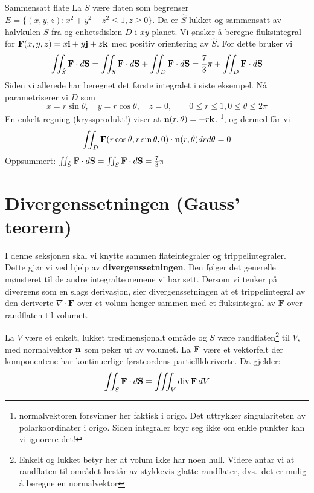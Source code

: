 \begin{eks}{Sammensatt flate}
La $\hat{S}$ være flaten som begrenser $E=\{(x,y,z) \colon x^2+y^2+z^2\leq 1, z \geq 0\}$. 
Da er $\hat{S}$ lukket og sammensatt av halvkulen $S$ fra  og enhetsdisken $D$ i $xy$-planet. 
Vi ønsker å beregne fluksintegral for $\mathbf{F}(x,y,z)=x\mathbf{i}+y\mathbf{j}+z\mathbf{k}$
med positiv orientering av $\hat{S}$. 
For dette bruker vi 
\begin{align*}
\iint_{\hat{S}} \mathbf{F} \cdot d \mathbf{S} = \iint_S \mathbf{F} \cdot d \mathbf{S} + \iint_D \mathbf{F} \cdot d \mathbf{S} = \frac{7}{3} \pi + \iint_D \mathbf{F} \cdot d \mathbf{S} 
\end{align*}
Siden vi allerede har beregnet det første integralet i siste eksempel. 
Nå parametriserer vi $D$ som
\[x= r \sin \theta , \quad y = r \cos \theta, \quad z =0, \qquad 0 \leq r \leq 1, 0\leq \theta \leq 2 \pi\]
En enkelt regning (kryssprodukt!) viser at $\mathbf{n}(r,\theta) = -r \mathbf{k}$.
\footnote{normalvektoren forsvinner her faktisk i origo. Det uttrykker singulariteten av polarkoordinater i origo. Siden integraler bryr seg ikke om enkle punkter kan vi ignorere det!}, og dermed får vi \[\iint_D \mathbf{F}(r\cos \theta, r \sin \theta,0) \cdot \mathbf{n}(r,\theta) dr d\theta = 0   \]
Oppsummert: $\iint_{\hat{S}} \mathbf{F} \cdot d \mathbf{S} = \iint_S \mathbf{F} \cdot d \mathbf{S} = \frac{7}{3}\pi$
\end{eks}

%
%
%
\section{Divergenssetningen (Gauss' teorem)}

I denne seksjonen skal vi knytte sammen flateintegraler og trippelintegraler. 
Dette gjør vi ved hjelp av \textbf{divergenssetningen}. 
Den følger det generelle mønsteret til de andre integralteoremene vi har sett.  
Dersom vi tenker på divergens som en slags derivasjon, sier divergenssetningen at et trippelintegral av den deriverte 
$\nabla \cdot \mathbf{F}$ over et volum henger sammen med et fluksintegral av \(\mathbf{F}\) over randflaten til volumet. 

\begin{thm} \label{thm:divergens}
La \( V \) være et enkelt, lukket tredimensjonalt område og \( S \) være randflaten\footnote{Enkelt og lukket betyr her at volum ikke har noen hull. 
Videre antar vi at randflaten til området består av stykkevis glatte randflater, dvs.\ det er mulig å beregne en normalvektor} til \( V \), med normalvektor $\mathbf{n}$ som peker ut av volumet. 
La \( \mathbf{F} \) være et vektorfelt der komponentene har kontinuerlige førsteordens partielllderiverte. 
Da gjelder:
\[
\iint_S \mathbf{F} \cdot d\mathbf{S} = \iiint_V \mathrm{div} \, \mathbf{F} \, dV
\]
\end{thm}

